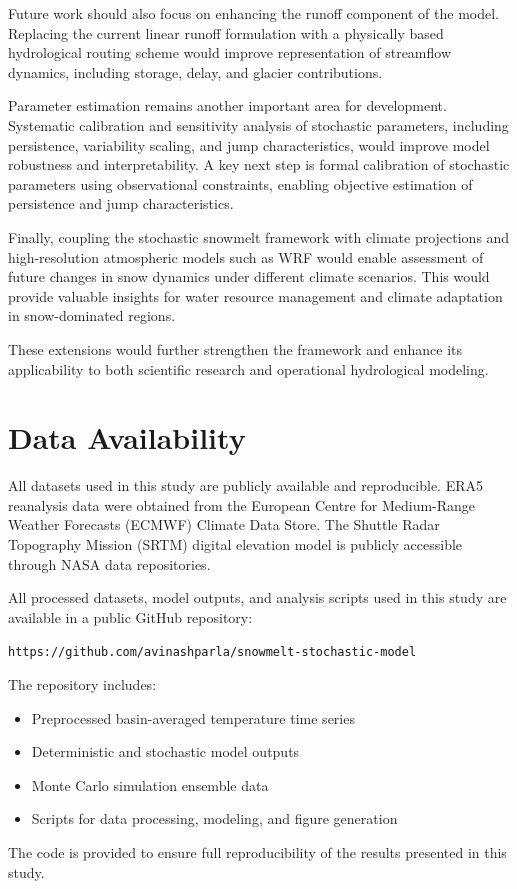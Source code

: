 \documentclass[11pt]{article}
\begin{document}
Future work should also focus on enhancing the runoff component of the model. Replacing the current linear runoff formulation with a physically based hydrological routing scheme would improve representation of streamflow dynamics, including storage, delay, and glacier contributions.

Parameter estimation remains another important area for development. Systematic calibration and sensitivity analysis of stochastic parameters, including persistence, variability scaling, and jump characteristics, would improve model robustness and interpretability. A key next step is formal calibration of stochastic parameters using observational constraints, enabling objective estimation of persistence and jump characteristics.

Finally, coupling the stochastic snowmelt framework with climate projections and high-resolution atmospheric models such as WRF would enable assessment of future changes in snow dynamics under different climate scenarios. This would provide valuable insights for water resource management and climate adaptation in snow-dominated regions.

These extensions would further strengthen the framework and enhance its applicability to both scientific research and operational hydrological modeling.

\section*{Data Availability}

All datasets used in this study are publicly available and reproducible. ERA5 reanalysis data were obtained from the European Centre for Medium-Range Weather Forecasts (ECMWF) Climate Data Store. The Shuttle Radar Topography Mission (SRTM) digital elevation model is publicly accessible through NASA data repositories.

All processed datasets, model outputs, and analysis scripts used in this study are available in a public GitHub repository:

\begin{center}
	\texttt{https://github.com/avinashparla/snowmelt-stochastic-model}
\end{center}

The repository includes:
\begin{itemize}
	\item Preprocessed basin-averaged temperature time series
	\item Deterministic and stochastic model outputs
	\item Monte Carlo simulation ensemble data
	\item Scripts for data processing, modeling, and figure generation
\end{itemize}

The code is provided to ensure full reproducibility of the results presented in this study.

	
	
	
	
\end{document}
